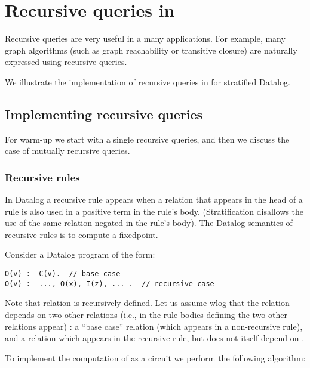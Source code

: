 \section{Recursive queries in \dbsp}\label{sec:recursive}

Recursive queries are very useful in a many applications.
For example, many graph algorithms (such as graph reachability
or transitive closure) are naturally expressed using recursive queries.

We illustrate the implementation of recursive queries in \dbsp for
stratified Datalog.

\subsection{Implementing recursive queries}

For warm-up we start with a single recursive queries, and then we discuss
the case of mutually recursive queries.

\subsubsection{Recursive rules}\label{sec:recursion}

In Datalog a recursive rule appears when a relation that appears in the head of a rule
is also used in a positive term in the rule's body.  (Stratification disallows
the use of the same relation negated in the rule's body).
The Datalog semantics of recursive rules is to compute a fixedpoint.

Consider a Datalog program of the form:

\begin{lstlisting}[language=ddlog]
O(v) :- C(v).  // base case
O(v) :- ..., O(x), I(z), ... .  // recursive case
\end{lstlisting}

Note that relation  is recursively defined.  Let us assume wlog that the 
relation depends on two other relations (i.e., in the rule bodies defining  the 
two other relations appear) : a ``base case'' relation  (which appears in a 
non-recursive rule), and a relation  which appears in the recursive rule, but
does not itself depend on .

To implement the computation of  as a circuit we perform the following algorithm:

